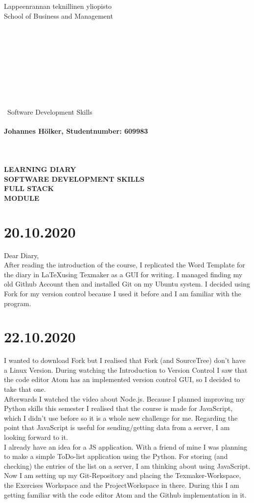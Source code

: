 \documentclass{article}
\begin{document}
\begin{Large}
Lappeenrannan teknillinen yliopisto\\
School of Business and Management
\\\\\\\\\\\\\\\\\\\\\
Software Development Skills\\\\
\textbf{Johannes Hölker, Studentnumber: 609983}\\\\\\\\
\textbf{LEARNING DIARY\\ SOFTWARE DEVELOPMENT SKILLS\\ FULL STACK\\MODULE}
\end{Large}

\newpage 


\tableofcontents

\newpage

\section{20.10.2020} 
Dear Diary,\\
After reading the introduction of the course, I replicated the Word Template for the diary in \LaTeX using Texmaker as a GUI for writing. I managed finding my old Github Account then and installed Git on my Ubuntu system. I decided using Fork for my version control because I used it before and I am familiar with the program.
\section{22.10.2020}
I wanted to download Fork but I realised that Fork (and SourceTree) don't have a Linux Version. During watching the Introduction to Version Control I saw that the code editor Atom has an implemented version control GUI, so I decided to take that one.\\
Afterwards I watched the video about Node.js. Because I planned improving my Python skills this semester I realised that the course is made for JavaScript, which I didn't use before so it is a whole new challenge for me. Regarding the point that JavaScript is useful for sending/getting data from a server, I am looking forward to it.\\
I already have an idea for a JS application. With a friend of mine I was planning to make a simple ToDo-list application using the Python. For storing (and checking) the entries of the list on a server, I am thinking about using JavaScript.\\
Now I am setting up my Git-Repository and placing the Texmaker-Workspace, the Exercises Workspace and the ProjectWorkspace in there. During this I am getting familiar with the code editor Atom and the Github implementation in it.

\pagebreak 
%
\end{document}
